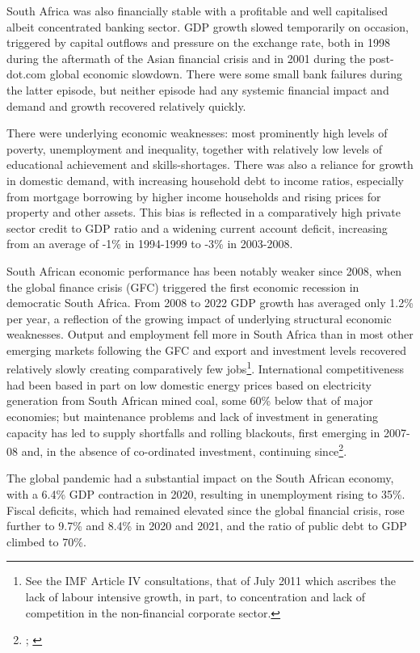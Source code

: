 \documentclass[
]{article}
\begin{document}
South Africa was also financially stable with a profitable and well capitalised albeit concentrated banking sector. GDP growth slowed temporarily on occasion, triggered by capital outflows and pressure on the exchange rate, both in 1998 during the aftermath of the Asian financial crisis and in 2001 during the post-dot.com global economic slowdown. There were some small bank failures during the latter episode, but neither episode had any systemic financial impact and demand and growth recovered relatively quickly.

There were underlying economic weaknesses: most prominently high levels of poverty, unemployment and inequality, together with relatively low levels of educational achievement and skills-shortages. There was also a reliance for growth in domestic demand, with increasing household debt to income ratios, especially from mortgage borrowing by higher income households and rising prices for property and other assets. This bias is reflected in a comparatively high private sector credit to GDP ratio and a widening current account deficit, increasing from an average of -1\% in 1994-1999 to -3\% in 2003-2008.

South African economic performance has been notably weaker since 2008, when the global finance crisis (GFC) triggered the first economic recession in democratic South Africa. From 2008 to 2022 GDP growth has averaged only 1.2\% per year, a reflection of the growing impact of underlying structural economic weaknesses. Output and employment fell more in South Africa than in most other emerging markets following the GFC and export and investment levels recovered relatively slowly creating comparatively few jobs\footnote{See the IMF Article IV consultations, that of July 2011 which ascribes the lack of labour intensive growth, in part, to concentration and lack of competition in the non-financial corporate sector.}. International competitiveness had been based in part on low domestic energy prices based on electricity generation from South African mined coal, some 60\% below that of major economies; but maintenance problems and lack of investment in generating capacity has led to supply shortfalls and rolling blackouts, first emerging in 2007-08 and, in the absence of co-ordinated investment, continuing since\footnote{\citet{ateba2019strategic}; \citet{folly2021competition}}.

The global pandemic had a substantial impact on the South African economy, with a 6.4\% GDP contraction in 2020, resulting in unemployment rising to 35\%. Fiscal deficits, which had remained elevated since the global financial crisis, rose further to 9.7\% and 8.4\% in 2020 and 2021, and the ratio of public debt to GDP climbed to 70\%.
\end{document}
